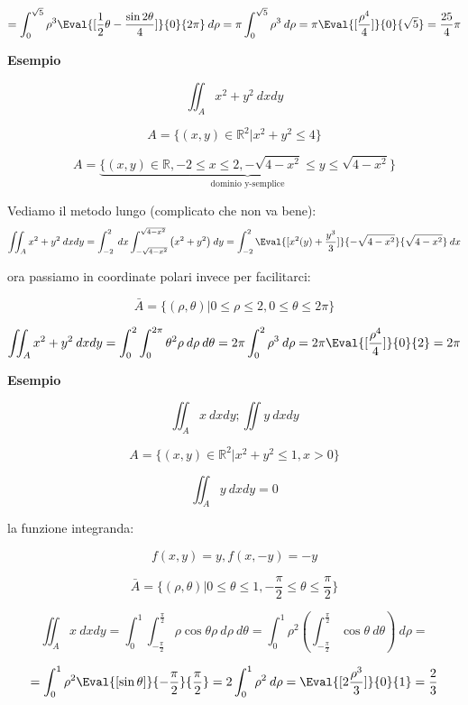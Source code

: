 \documentclass[../appunti-analisi.tex]{subfiles}
\begin{document}
\[
    = \int_{0}^{\sqrt{5}} {\rho^{3} \Eval{[ \frac{1}{2} \theta - \frac{\sin 2 \theta}{4}]}{0}{2\pi} } \: d \rho = \pi \int_{0}^{\sqrt{5}} {\rho^{3}} \: d \rho  = \pi \Eval{[ \frac{\rho^{4}}{4}]}{0}{\sqrt{5}}  = \frac{25}{4}\pi 
\]

\textbf{Esempio} 

\[
\iint_A {x^{2}+y^{2}} \: d x d y  
\]

\[
    A = \{(x,y) \in \mathbb{R}^{2} | x^{2} + y^{2} \le 4\}
\]

\[
    A = \underbrace{\{(x,y) \in \mathbb{R}, -2 \le x \le 2, - \sqrt{4-x^{2}} \le  y \le  \sqrt{4 -x^{2}}\}}_\text{dominio y-semplice}\]

Vediamo il metodo lungo (complicato che non va bene):
\[
    \iint_A {x^{2}+y^{2}} \: d x d y = \int_{-2}^{2} {} \: dx  \int_{-\sqrt{4-x^{2}}}^{\sqrt{4-x^{2}}} {\left(x^{2} + y^{2}\right)} \: d y  = \int_{-2}^{2} { \Eval{[x^{2}(y)+ \frac{y^{3}}{3}]}{-\sqrt{4-x^{2}}}{\sqrt{4-x^{2}}} } \: dx 
\]

ora passiamo in coordinate polari invece per facilitarci:

\[
    \bar{A}  = \{(\rho,\theta) | 0 \le \rho \le 2, 0 \le \theta \le 2\pi\}
\]

\[
    \iint_A {x^{2}+y^{2}} \: d x d y = \int_{0}^{2} {\int_{0}^{2\pi} {\theta^{2} \rho} \: d \rho } \: d \theta = 2\pi \int_{0}^{2} {\rho^{3}} \: d \rho = 2\pi \Eval{[ \frac{\rho^{4}}{4}]}{0}{2} = 2\pi 
\]

\textbf{Esempio} 

\[
\iint_A {x} \: dx d y; \iint {y} \: d x d y  
\]

\[
    A = \{(x,y) \in \mathbb{R}^{2} | x^{2}+y^{2} \le 1, x>0\}
\]

\[
    \iint_A {y} \: d x d y =0 
\]

la funzione integranda:

\[
    f(x,y) = y, f(x,-y) = -y
\]

\[
    \bar{A} = \{(\rho,\theta) | 0 \le \theta \le 1, - \frac{\pi}{2} \le \theta \le \frac{\pi}{2}\}
\]

\[
    \iint_A {x} \: d x d y  = \int_{0}^{1} {\int_{- \frac{\pi}{2}}^{ \frac{\pi}{2}} {\rho \cos \theta \rho} \: d \rho } \: d \theta = \int_{0}^{1} {\rho^{2} \left(\int_{- \frac{\pi}{2}}^{ \frac{\pi}{2}} {\cos \theta} \: d \theta \right)} \: d \rho =  
\]

\[
    =\int_{0}^{1} {\rho^{2}\Eval{[\sin \theta]}{ - \frac{\pi}{2}}{ \frac{\pi}{2}} } = 2 \int_{0}^{1} {\rho^{2}} \: d \rho = \Eval{[2 \frac{\rho^{3}}{3} ]}{0}{1} = \frac{2}{3}
\]
\end{document}
